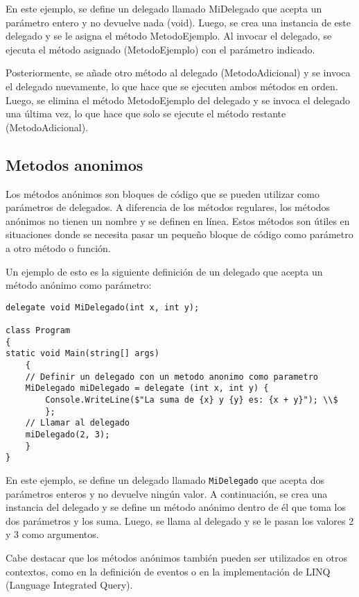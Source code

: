 \documentclass[executivepaper]{article}
\begin{document}
En este ejemplo, se define un delegado llamado MiDelegado que acepta un parámetro entero y no devuelve nada (void). Luego, se crea una instancia de este delegado y se le asigna el método MetodoEjemplo. Al invocar el delegado, se ejecuta el método asignado (MetodoEjemplo) con el parámetro indicado.

Posteriormente, se añade otro método al delegado (MetodoAdicional) y se invoca el delegado nuevamente, lo que hace que se ejecuten ambos métodos en orden. Luego, se elimina el método MetodoEjemplo del delegado y se invoca el delegado una última vez, lo que hace que solo se ejecute el método restante (MetodoAdicional).

\subsection{Metodos anonimos}

Los métodos anónimos son bloques de código que se pueden utilizar como parámetros de delegados. A diferencia de los métodos regulares, los métodos anónimos no tienen un nombre y se definen en línea. Estos métodos son útiles en situaciones donde se necesita pasar un pequeño bloque de código como parámetro a otro método o función.

Un ejemplo de esto es la siguiente definición de un delegado que acepta un método anónimo como parámetro:

\begin{lstlisting}
delegate void MiDelegado(int x, int y);

class Program
{
static void Main(string[] args)
    {
    // Definir un delegado con un metodo anonimo como parametro
    MiDelegado miDelegado = delegate (int x, int y) {
        Console.WriteLine($"La suma de {x} y {y} es: {x + y}"); \\$
        };
    // Llamar al delegado
    miDelegado(2, 3);
    }
}
\end{lstlisting}

En este ejemplo, se define un delegado llamado \texttt{MiDelegado} que acepta dos parámetros enteros y no devuelve ningún valor. A continuación, se crea una instancia del delegado y se define un método anónimo dentro de él que toma los dos parámetros y los suma. Luego, se llama al delegado y se le pasan los valores 2 y 3 como argumentos.

Cabe destacar que los métodos anónimos también pueden ser utilizados en otros contextos, como en la definición de eventos o en la implementación de LINQ (Language Integrated Query).
\end{document}
